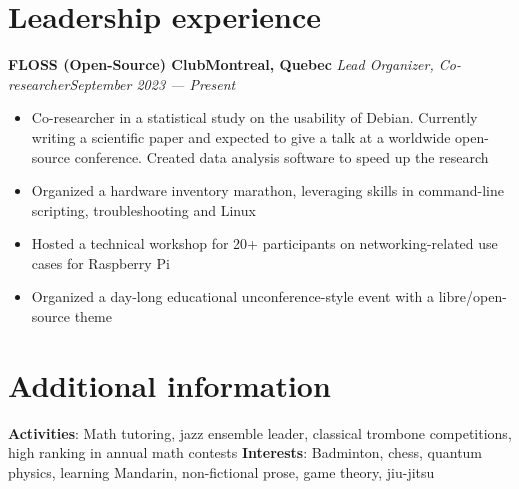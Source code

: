 \documentclass{article}
\newcommand{\newrole}[4]{
    {\normalfont\bfseries #1\hfill#3}
    \newline
    \textit{#2}\hfill\textit{#4}
}
\newenvironment{bulletpoints}{\begin{itemize}\setlength\itemsep{-0.3em}}{\end{itemize}}
\begin{document}
\section*{Leadership experience}
\newrole{FLOSS (Open-Source) Club}{Lead Organizer, Co-researcher}{Montreal, Quebec}{September 2023 --- Present}
\begin{bulletpoints}
    \item Co-researcher in a statistical study on the usability of Debian. Currently writing a scientific paper and expected to give a talk at a worldwide open-source conference. Created data analysis software to speed up the research
    \item Organized a hardware inventory marathon, leveraging skills in command-line scripting, troubleshooting and Linux
    \item Hosted a technical workshop for 20+ participants on networking-related use cases for Raspberry Pi
    \item Organized a day-long educational unconference-style event with a libre/open-source theme
\end{bulletpoints}


\section*{Additional information}
{\bfseries Activities}: Math tutoring, jazz ensemble leader, classical trombone competitions, high ranking in annual math contests
\newline
{\bfseries Interests}: Badminton, chess, quantum physics, learning Mandarin, non-fictional prose, game theory, jiu-jitsu
\end{document}
